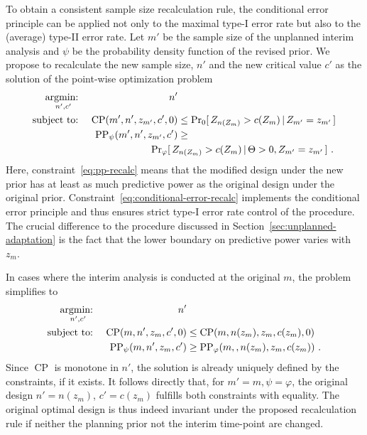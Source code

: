 \documentclass[12pt]{article}
\renewcommand{\Pr}{\operatorname{Pr}}
\newcommand{\st}{\operatorname{subject\ to:\ }}
\newcommand{\argmin}[1]{\operatornamewithlimits{argmin:\ }_{#1}}
\newcommand{\CP}{\ensuremath{\operatorname{CP}}}
\newcommand{\PP}{\ensuremath{\operatorname{PP}}}
\renewcommand{\Pr}{\ensuremath{\operatorname{Pr}}}
\newcommand{\cond}{\ensuremath{\,|\,}}
\begin{document}
To obtain a consistent sample size recalculation rule,
the conditional error principle can be applied not only to the
maximal type-I error rate but also to the (average) type-II error rate.
Let $m'$ be the sample size of the unplanned interim analysis and
$\psi$ be the probability density function of the revised prior.
We propose to recalculate the new sample size, $n'$ and
the new critical value $c'$ as the solution of the point-wise optimization problem
\begin{align}
    \argmin{n',c'} && n' &\\
     \st && \CP(m', n', z_{m'}, c', 0) &\leq \Pr_0[\,Z_{n(Z_m)} > c(Z_m) \cond Z_{m'} = z_{m'}\,] \label{eq:conditional-error-recalc}\\
     && \PP_\psi(m', n', z_{m'}, c') &\geq \nonumber \\
     && & \hspace*{-1cm}\Pr_\varphi[\,Z_{n(Z_m)} > c(Z_m) \cond \Theta >0, Z_{m'} = z_{m'}\,] \label{eq:pp-recalc} \ .
\end{align}
Here, constraint~\eqref{eq:pp-recalc} means that the modified design under the new prior has at least as much predictive power as the original design under the original prior.
Constraint~\eqref{eq:conditional-error-recalc} implements the conditional error principle and thus ensures strict type-I error rate control of the
procedure.
The crucial difference to the procedure discussed in Section~\ref{sec:unplanned-adaptation} is the fact that the lower boundary on predictive power varies with $z_m$.

In cases where the interim analysis is conducted at the original $m$,
the problem simplifies to
\begin{align}
    \argmin{n',c'} && n' & \label{eq:objective-original-interim}\\
    \st
    && \CP(m, n', z_{m}, c', 0) &\leq \CP(m, n(z_m), z_{m}, c(z_m), 0) \\
    && \PP_\psi(m, n', z_{m}, c') &\geq \PP_\varphi(m, , n(z_m), z_{m}, c(z_m))  \label{eq:pp-original-interim} \ .
\end{align}
Since $\CP$ is monotone in $n'$, the solution is already uniquely
defined by the constraints, if it exists.
It follows directly that, for $m'=m, \psi=\varphi$,
the original design ${n'=n(z_{m})}$, ${c'=c(z_m)}$ fulfills both constraints with equality.
The original optimal design is thus indeed invariant under the
proposed recalculation rule if neither the planning prior not the interim time-point are changed.
\end{document}
